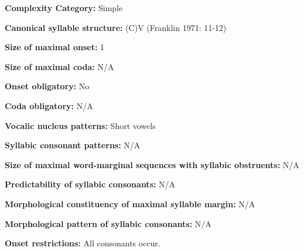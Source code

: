 \begin{styleBody}
\textbf{Complexity Category:} Simple
\end{styleBody}

\begin{styleBody}
\textbf{Canonical syllable structure:} (C)V\textbf{ }(Franklin 1971: 11-12)
\end{styleBody}

\begin{styleBody}
\textbf{Size of maximal onset:} 1
\end{styleBody}

\begin{styleBody}
\textbf{Size of maximal coda:} N/A
\end{styleBody}

\begin{styleBody}
\textbf{Onset obligatory:} No
\end{styleBody}

\begin{styleBody}
\textbf{Coda obligatory:} N/A
\end{styleBody}

\begin{styleBody}
\textbf{Vocalic nucleus patterns:} Short vowels
\end{styleBody}

\begin{styleBody}
\textbf{Syllabic consonant patterns:} N/A
\end{styleBody}

\begin{styleBody}
\textbf{Size of maximal word{}-marginal sequences with syllabic obstruents:} N/A
\end{styleBody}

\begin{styleBody}
\textbf{Predictability of syllabic consonants:} N/A
\end{styleBody}

\begin{styleBody}
\textbf{Morphological constituency of maximal syllable margin:} N/A
\end{styleBody}

\begin{styleBody}
\textbf{Morphological pattern of syllabic consonants:} N/A
\end{styleBody}

\begin{styleBody}
\textbf{Onset restrictions: }All consonants occur.
\end{styleBody}

